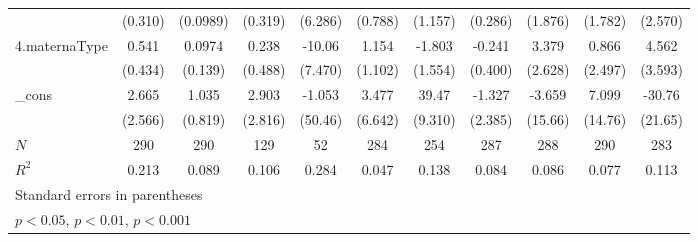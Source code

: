 {\begin{tabular}{l*{10}{c}}
            &     (0.310)         &    (0.0989)         &     (0.319)         &     (6.286)         &     (0.788)         &     (1.157)         &     (0.286)         &     (1.876)         &     (1.782)         &     (2.570)         \\
\addlinespace
4.maternaType&       0.541         &      0.0974         &       0.238         &      -10.06         &       1.154         &      -1.803         &      -0.241         &       3.379         &       0.866         &       4.562         \\
            &     (0.434)         &     (0.139)         &     (0.488)         &     (7.470)         &     (1.102)         &     (1.554)         &     (0.400)         &     (2.628)         &     (2.497)         &     (3.593)         \\
\addlinespace
\_cons      &       2.665         &       1.035         &       2.903         &      -1.053         &       3.477         &       39.47\sym{***}&      -1.327         &      -3.659         &       7.099         &      -30.76         \\
            &     (2.566)         &     (0.819)         &     (2.816)         &     (50.46)         &     (6.642)         &     (9.310)         &     (2.385)         &     (15.66)         &     (14.76)         &     (21.65)         \\
\midrule
\(N\)       &         290         &         290         &         129         &          52         &         284         &         254         &         287         &         288         &         290         &         283         \\
\(R^{2}\)   &       0.213         &       0.089         &       0.106         &       0.284         &       0.047         &       0.138         &       0.084         &       0.086         &       0.077         &       0.113         \\
\bottomrule
\multicolumn{11}{l}{\footnotesize Standard errors in parentheses}\\
\multicolumn{11}{l}{\footnotesize \sym{*} \(p<0.05\), \sym{**} \(p<0.01\), \sym{***} \(p<0.001\)}\\
\end{tabular}
}
